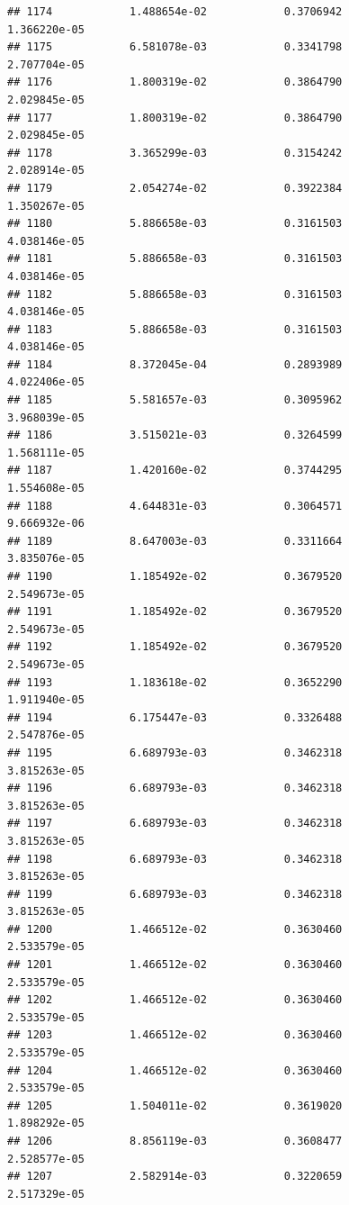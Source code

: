 \documentclass[
]{article}
\begin{document}
\begin{verbatim}
## 1174            1.488654e-02            0.3706942            1.366220e-05
## 1175            6.581078e-03            0.3341798            2.707704e-05
## 1176            1.800319e-02            0.3864790            2.029845e-05
## 1177            1.800319e-02            0.3864790            2.029845e-05
## 1178            3.365299e-03            0.3154242            2.028914e-05
## 1179            2.054274e-02            0.3922384            1.350267e-05
## 1180            5.886658e-03            0.3161503            4.038146e-05
## 1181            5.886658e-03            0.3161503            4.038146e-05
## 1182            5.886658e-03            0.3161503            4.038146e-05
## 1183            5.886658e-03            0.3161503            4.038146e-05
## 1184            8.372045e-04            0.2893989            4.022406e-05
## 1185            5.581657e-03            0.3095962            3.968039e-05
## 1186            3.515021e-03            0.3264599            1.568111e-05
## 1187            1.420160e-02            0.3744295            1.554608e-05
## 1188            4.644831e-03            0.3064571            9.666932e-06
## 1189            8.647003e-03            0.3311664            3.835076e-05
## 1190            1.185492e-02            0.3679520            2.549673e-05
## 1191            1.185492e-02            0.3679520            2.549673e-05
## 1192            1.185492e-02            0.3679520            2.549673e-05
## 1193            1.183618e-02            0.3652290            1.911940e-05
## 1194            6.175447e-03            0.3326488            2.547876e-05
## 1195            6.689793e-03            0.3462318            3.815263e-05
## 1196            6.689793e-03            0.3462318            3.815263e-05
## 1197            6.689793e-03            0.3462318            3.815263e-05
## 1198            6.689793e-03            0.3462318            3.815263e-05
## 1199            6.689793e-03            0.3462318            3.815263e-05
## 1200            1.466512e-02            0.3630460            2.533579e-05
## 1201            1.466512e-02            0.3630460            2.533579e-05
## 1202            1.466512e-02            0.3630460            2.533579e-05
## 1203            1.466512e-02            0.3630460            2.533579e-05
## 1204            1.466512e-02            0.3630460            2.533579e-05
## 1205            1.504011e-02            0.3619020            1.898292e-05
## 1206            8.856119e-03            0.3608477            2.528577e-05
## 1207            2.582914e-03            0.3220659            2.517329e-05

\end{verbatim}
\end{document}
